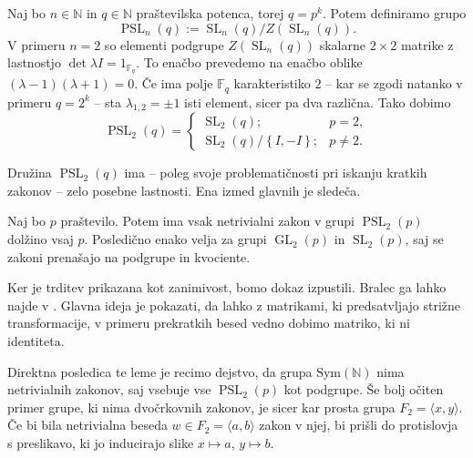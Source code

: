 \begin{definicija}\label{def_pslnq_in_psl2q}
    Naj bo $n \in \mathbb{N}$ in $q \in \mathbb{N}$ praštevilska potenca, torej $q = p^{k}$. Potem definiramo grupo \begin{equation*}
        \operatorname{PSL}_n(q) := {\operatorname{SL}_n(q)} / {Z(\operatorname{SL}_n(q))}.
     \end{equation*}   
    V primeru $n = 2$ so elementi podgrupe $Z(\operatorname{SL}_n(q))$ skalarne $2 \times 2$ matrike z lastnostjo $\det \lambda I = 1_{\mathbb{F}_q}$. To enačbo prevedemo na enačbo oblike $(\lambda - 1)(\lambda + 1) = 0$.
    Če ima polje $\mathbb{F}_q$ karakteristiko $2$ -- kar se zgodi natanko v primeru $q = 2^{k}$ -- sta $\lambda_{1,2} = \pm 1$ isti element, sicer pa dva različna. Tako dobimo
    \begin{equation*}
                \operatorname{PSL}_2(q) = \begin{cases}
                    \operatorname{SL}_2(q); & p = 2,  \\
                    {\operatorname{SL}_2(q)} / {\left\{ I, -I \right\} }; & p \neq 2.
                \end{cases}
             \end{equation*}   
    \end{definicija}
    
    Družina $\operatorname{PSL}_2(q)$ ima -- poleg svoje problematičnosti pri iskanju kratkih zakonov -- zelo posebne lastnosti. Ena izmed glavnih je sledeča. 
    \begin{trditev}\label{trd_dolzina_zakonov_za_psl2p}
    Naj bo $p$ praštevilo. Potem ima vsak netrivialni zakon v grupi $\operatorname{PSL}_2(p)$ dolžino vsaj $p$. Posledično enako velja za grupi $\operatorname{GL}_2(p)$ in $\operatorname{SL}_2(p)$,
    saj se zakoni prenašajo na podgrupe in kvociente.
    \end{trditev}
    \begin{dokaz}
        Ker je trditev prikazana kot zanimivost, bomo dokaz izpustili. Bralec ga lahko najde v \cite{Schneider_2016}. Glavna ideja je pokazati, da lahko z matrikami, ki predsatvljajo strižne transformacije,
        v primeru prekratkih besed vedno dobimo matriko, ki ni identiteta. %
        \end{dokaz}

    Direktna posledica te leme je recimo dejstvo, da grupa $\text{Sym}(\mathbb{N})$ nima netrivialnih zakonov, saj vsebuje vse $\operatorname{PSL}_2(p)$ kot podgrupe.
    Še bolj očiten primer grupe, ki nima dvočrkovnih zakonov, je sicer kar prosta grupa $F_2 = \langle x , y \rangle$. Če bi bila netrivialna beseda $w \in F_2 = \langle a , b \rangle$ zakon v njej,
    bi prišli do protislovja s preslikavo, ki jo inducirajo slike $x \mapsto a$, $y \mapsto b$.
    
